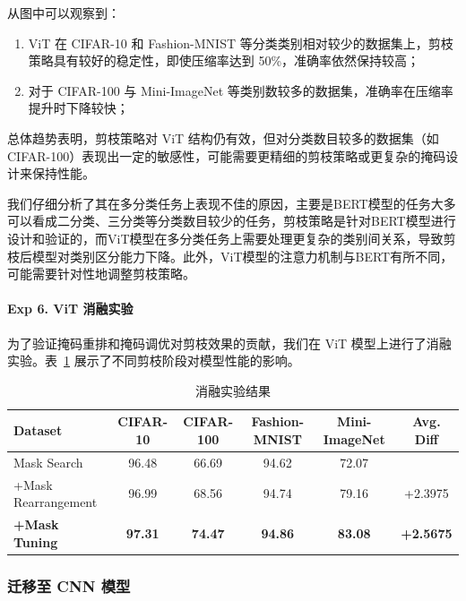 \documentclass[UTF8,openany]{ctexbook}
\begin{document}
从图中可以观察到：

\begin{enumerate}[noitemsep, topsep=0pt, parsep=0pt, partopsep=0pt, label=(\arabic*)]
    \item ViT 在 CIFAR-10 和 Fashion-MNIST 等分类类别相对较少的数据集上，剪枝策略具有较好的稳定性，即使压缩率达到 50\%，准确率依然保持较高；
    \item 对于 CIFAR-100 与 Mini-ImageNet 等类别数较多的数据集，准确率在压缩率提升时下降较快；
\end{enumerate}

总体趋势表明，剪枝策略对 ViT 结构仍有效，但对分类数目较多的数据集（如 CIFAR-100）表现出一定的敏感性，可能需要更精细的剪枝策略或更复杂的掩码设计来保持性能。

我们仔细分析了其在多分类任务上表现不佳的原因，主要是BERT模型的任务大多可以看成二分类、三分类等分类数目较少的任务，剪枝策略是针对BERT模型进行设计和验证的，而ViT模型在多分类任务上需要处理更复杂的类别间关系，导致剪枝后模型对类别区分能力下降。此外，ViT模型的注意力机制与BERT有所不同，可能需要针对性地调整剪枝策略。


\paragraph{Exp 6. ViT 消融实验} 为了验证掩码重排和掩码调优对剪枝效果的贡献，我们在 ViT 模型上进行了消融实验。表~\ref{tab:ablation_results_1} 展示了不同剪枝阶段对模型性能的影响。
\begin{table}[H]
    \centering
    \begin{tabular}{lcccc|c}
        \toprule
        Dataset & CIFAR-10 & CIFAR-100 & \small{Fashion-MNIST} & \small{Mini-ImageNet} & Avg. Diff \\
        \midrule
        Mask Search & 96.48 & 66.69 & 94.62 & 72.07 & \\
\footnotesize{+Mask Rearrangement} & 96.99 & 68.56 & 94.74 & 79.16 & +2.3975 \\
\small\textbf{+Mask Tuning} & \textbf{97.31} & \textbf{74.47} & \textbf{94.86} & \textbf{83.08} & \textbf{+2.5675} \\
        \bottomrule
    \end{tabular}
    \caption{消融实验结果}
    \label{tab:ablation_results_1}
\end{table}

\subsubsection{迁移至 CNN 模型} 
\end{document}
